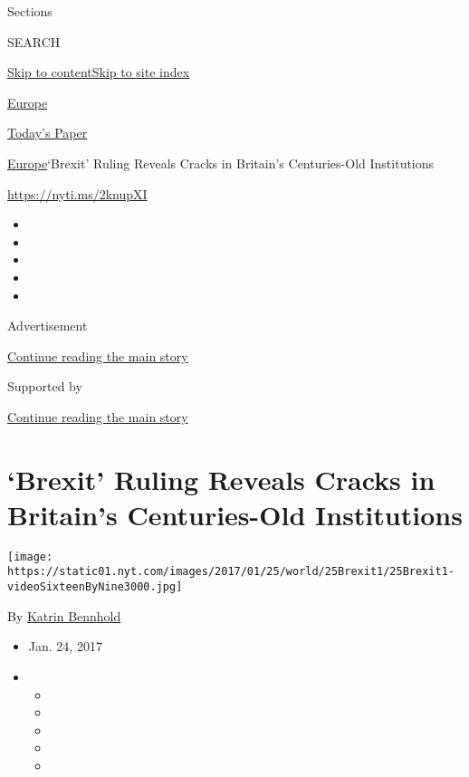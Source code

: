 Sections

SEARCH

\protect\hyperlink{site-content}{Skip to
content}\protect\hyperlink{site-index}{Skip to site index}

\href{https://www.nytimes.com/section/world/europe}{Europe}

\href{https://myaccount.nytimes.com/auth/login?response_type=cookie\&client_id=vi}{}

\href{https://www.nytimes.com/section/todayspaper}{Today's Paper}

\href{/section/world/europe}{Europe}\textbar{}`Brexit' Ruling Reveals
Cracks in Britain's Centuries-Old Institutions

\url{https://nyti.ms/2knupXI}

\begin{itemize}
\item
\item
\item
\item
\item
\end{itemize}

Advertisement

\protect\hyperlink{after-top}{Continue reading the main story}

Supported by

\protect\hyperlink{after-sponsor}{Continue reading the main story}

\hypertarget{brexit-ruling-reveals-cracks-in-britains-centuries-old-institutions}{%
\section{`Brexit' Ruling Reveals Cracks in Britain's Centuries-Old
Institutions}\label{brexit-ruling-reveals-cracks-in-britains-centuries-old-institutions}}

\texttt{[image: https://static01.nyt.com/images/2017/01/25/world/25Brexit1/25Brexit1-videoSixteenByNine3000.jpg]}

By \href{http://www.nytimes.com/by/katrin-bennhold}{Katrin Bennhold}

\begin{itemize}
\item
  Jan. 24, 2017
\item
  \begin{itemize}
  \item
  \item
  \item
  \item
  \item
  \end{itemize}
\end{itemize}

